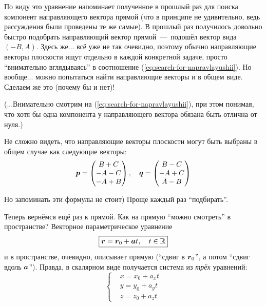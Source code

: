 \documentclass[a4paper,12pt]{article}
\begin{document}
  По виду это уравнение напоминает полученное в прошлый раз для поиска компонент направляющего вектора прямой (что в принципе не удивительно, ведь рассуждения были проведены те же самые).
  В прошлый раз получилось довольно быстро подобрать направляющий вектор прямой~---~подошёл вектор вида $(-B, A)$.
  Здесь же... всё уже не так очевидно, поэтому обычно направляющие векторы плоскости ищут отдельно в каждой конкретной задаче, просто ``внимательно вглядываясь'' в соотношение (\ref{eq:search-for-napravlayushii}).
  Но вообще... можно попытаться найти направляющие векторы и в общем виде.
  Сделаем же это (почему бы и нет)!
  
  (...Внимательно смотрим на (\ref{eq:search-for-napravlayushii}), при этом понимая, что хотя бы одна компонента у направляющего вектора обязана быть отлична от нуля.)
  
  Не сложно видеть, что направляющие векторы плоскости могут быть выбраны в общем случае как следующие векторы:
  \begin{equation}\label{eq:two-vectors-for-plane-in-general}
    \boldsymbol p = \begin{pmatrix}
      B + C\\
      -A - C\\
      -A + B
    \end{pmatrix},
    \quad \boldsymbol q = \begin{pmatrix}
      B - C\\
      -A + C\\
      A - B
    \end{pmatrix}
  \end{equation}
  
  Но запоминать эти формулы не стоит)
  Проще каждый раз ``подбирать''.
  
  \bigskip
  
  Теперь вернёмся ещё раз к прямой.
  Как на прямую ``можно смотреть'' в пространстве?
  Векторное параметрическое уравнение
  \begin{equation}\label{eq:line-vector-parametric}
    \boxed{\boldsymbol r = \boldsymbol r_0 + \boldsymbol a t,\quad t \in \operatorname{\mathbb R}}
  \end{equation}
  и в пространстве, очевидно, описывает прямую (``сдвиг в $\boldsymbol r_0$'', а потом ``сдвиг вдоль $\boldsymbol a$'').
  Правда, в скалярном виде получается система из \emph{трёх} уравнений:
  \[
    \left\{
      \begin{aligned}
        &x = x_0 + a_x t\\
        &y = y_0 + a_y t\\
        &z = z_0 + a_z t
      \end{aligned}
    \right.
  \]
  
\end{document}
